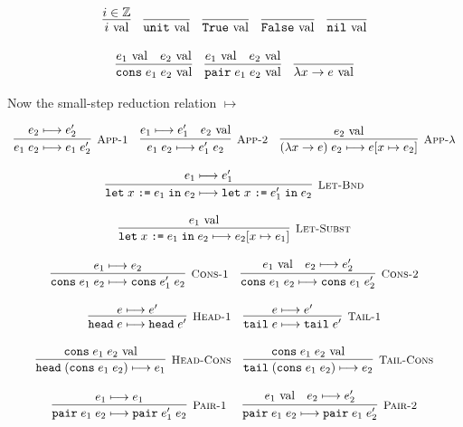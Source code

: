 \documentclass[10pt]{article}
\newcommand{\ttt}[1]{\texttt{#1}}
\newcommand{\ra}{\ensuremath{\rightarrow}}
\newcommand{\reduces}{\ensuremath{\longmapsto}}
\newcommand{\val}{\textnormal{ val}}
\newcommand{\True}{\ttt{True}}
\newcommand{\False}{\ttt{False}}
\newcommand{\head}{\ttt{head}}
\newcommand{\tail}{\ttt{tail}}
\newcommand{\cons}{\ttt{cons}}
\newcommand{\nil}{\ttt{nil}}
\newcommand{\unit}{\ttt{unit}}
\newcommand{\pair}{\ttt{pair}}
\newcommand{\letbnd}{\ttt{let}}
\newcommand{\inexpr}{\ttt{in}}
\newcommand{\labinfer} [3] [] {\infer[{\small\textsc{#1}}]{#2}{#3}}
\begin{document}
\[
  \begin{array}{cc}
    \infer{i \val}{i \in \mathbb{Z}}
    ~~~
    \infer{\unit \val}{}
    ~~~
    \infer{\True \val}{}
    ~~~
    \infer{\False \val}{}
    ~~~
    \infer{\nil \val}{}
    \\\\
    \infer{\cons\; e_1\; e_2 \val}{e_1 \val & e_2 \val}
    ~~~
    \infer{\pair\; e_1\; e_2 \val}{e_1 \val & e_2 \val}
    ~~~
    \infer{\lambda x \ra e \val}{}
  \end{array}
\]

\noindent
Now the small-step reduction relation $\reduces$


\[
  \begin{array}{cc}
    \labinfer[App-1]{e_1\; e_2 \reduces e_1\; e_2'}{e_2 \reduces e_2'}
    ~~~
    \labinfer[App-2]{e_1\; e_2 \reduces e_1'\; e_2}{e_1 \reduces e_1' & e_2 \val}
    ~~~
    \labinfer[App-$\lambda$]{(\lambda x \ra e)\; e_2 \reduces e[x\mapsto e_2]}{e_2 \val}
    \\\\
    \labinfer[Let-Bnd]{\letbnd\; x\; \ttt{:=}\; e_1\; \inexpr\; e_2 \reduces \letbnd\; x\; \ttt{:=}\; e_1'\; \inexpr\; e_2}
       {e_1 \reduces e_1'}
    \\\\
    \labinfer[Let-Subst]{\letbnd\; x\; \ttt{:=}\; e_1\; \inexpr\; e_2 \reduces e_2[x\mapsto e_1]}{e_1 \val}
    \\\\
    \labinfer[Cons-1]{\cons\; e_1\; e_2 \reduces \cons\; e_1'\; e_2}{e_1 \reduces e_2}
    ~~~
    \labinfer[Cons-2]{\cons\; e_1\; e_2 \reduces \cons\; e_1\; e_2'}{e_1 \val & e_2 \reduces e_2'}
    \\\\
    \labinfer[Head-1]{\head\; e \reduces \head\; e'}{e \reduces e'}
    ~~~
    \labinfer[Tail-1]{\tail\; e \reduces \tail\; e'}{e \reduces e'}
    \\\\
    \labinfer[Head-Cons]{\head\; (\cons\; e_1\; e_2) \reduces e_1}{\cons\; e_1\; e_2 \val}
    ~~~
    \labinfer[Tail-Cons]{\tail\; (\cons\; e_1\; e_2) \reduces e_2}{\cons\; e_1\; e_2 \val}
    \\\\
    \labinfer[Pair-1]{\pair\; e_1\; e_2 \reduces \pair\; e_1'\; e_2}{e_1 \reduces e_1}
    ~~~~
    \labinfer[Pair-2]{\pair\; e_1\; e_2 \reduces \pair\; e_1\; e_2'}{e_1 \val & e_2 \reduces e_2'}
    \\\\

\end{array}\]
\end{document}
